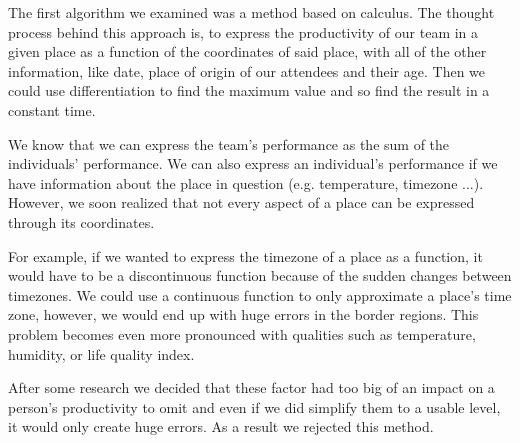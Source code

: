 
The first algorithm we examined was a method based on calculus. The thought process behind this approach is, to express the productivity of our team in a given place as a function of the coordinates of said place, with all of the other information, like date, place of origin of our attendees and their age. Then we could use differentiation to find the maximum value and so find the result in a constant time. 

We know that we can express the team's performance as the sum of the individuals' performance. We can also express an individual's performance if we have information about the place in question (e.g. temperature, timezone ...). However, we soon realized that not every aspect of a place can be expressed through its coordinates. 

For example, if we wanted to express the timezone of a place as a function, it would have to be a discontinuous function because of the sudden changes between timezones. We could use a continuous function to only approximate a place's time zone, however, we would end up with huge errors in the border regions. This problem becomes even more pronounced with qualities such as temperature, humidity, or life quality index. 

After some research we decided that these factor had too big of an impact on a person's productivity to omit and even if we did simplify them to a usable level, it would only create huge errors. As a result we rejected this method.
